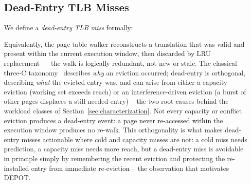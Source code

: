\subsection{Dead-Entry TLB Misses}

We define a \emph{dead-entry TLB miss} formally:

\begin{center}
\end{center}

\noindent Equivalently, the page-table walker reconstructs a translation that was valid
and present within the current execution window, then discarded by LRU
replacement~\cite{lru,belady} -- the walk is logically redundant, not new
or stale. The classical three-C taxonomy~\cite{hill_smith_3c} describes
\emph{why} an eviction occurred; dead-entry is orthogonal, describing
\emph{what} the evicted entry was, and can arise from either a capacity
eviction (working set exceeds reach) or an interference-driven eviction (a
burst of other pages displaces a still-needed entry) -- the two root
causes behind the workload classes of Section~\ref{sec:characterization}.
Not every capacity or conflict eviction produces a dead-entry event: a
page never re-accessed within the execution window produces no re-walk.
This orthogonality is what makes dead-entry misses actionable where cold
and capacity misses are not: a cold miss needs prediction, a capacity miss
needs more reach, but a dead-entry miss is avoidable in principle simply
by remembering the recent eviction and protecting the re-installed entry
from immediate re-eviction -- the observation that motivates DEPOT.
